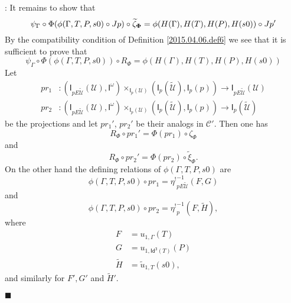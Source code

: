 \documentclass[12pt]{article}
\numberwithin{equation}{section}
\newenvironment{myproof}{{\bf Proof}:}{$\blacksquare$ \vskip 5mm }
\newcommand{\sr}{\rightarrow}
\newcommand{\wt}{\widetilde}
\newcommand{\Idx}{\mathsf{Id^3}} %
\newcommand{\U}{\mathcal{U}}
\newcommand{\I}{\mathsf{I}}
\newcommand{\etashriek}{\eta^!}
\newcommand{\etaunshriek}{{\etashriek}^{-1}}
\begin{document}
\begin{myproof}
It remains to show that
%
$$\psi_{\Gamma}\circ \Phi(\phi(\Gamma,T,P,s0)\circ Jp)\circ
\wt{\zeta}_{\bf\Phi}=\phi(H(\Gamma),H(T),H(P),H(s0))\circ Jp'$$
%
By the compatibility condition of Definition \ref{2015.04.06.def6} we see that
it is sufficient to prove that
%
$$\psi_{\Gamma}\circ \Phi(\phi(\Gamma,T,P,s0))\circ R_{\Phi} =
\phi(H(\Gamma),H(T),H(P),H(s0))$$
%
Let
%
\begin{align*}
  pr_1 & :(\I_{pE\wt{\U}}(\U),\I^{\omega})\times_{\I_{p}(\U)}(\I_{p}(\wt{\U}),\I_p(p))\sr \I_{pE\wt{\U}}(\U) \\
  pr_2 & :(\I_{pE\wt{\U}}(\U),\I^{\omega})\times_{\I_{p}(\U)}(\I_{p}(\wt{\U}),\I_p(p))\sr \I_{p}(\wt{\U})
\end{align*}
%
be the projections and let $pr_1'$, $pr_2'$ be their analogs in $\mathcal
C'$. Then one has
%
$$R_{\Phi}\circ pr_1'=\Phi(pr_1)\circ \zeta_{\Phi}$$
and
$$R_{\Phi}\circ pr_2'=\Phi(pr_2)\circ \wt{\xi}_{\Phi}.$$
%
On the other hand the defining relations of $\phi(\Gamma,T,P,s0)$ are
%
$$\phi(\Gamma,T,P,s0)\circ pr_1=\etaunshriek_{pE\wt{\U}}(F,G)$$
and
$$\phi(\Gamma,T,P,s0)\circ pr_2=\etaunshriek_p(F,\wt{H}),$$
%
where
%
\begin{align*}
  F&=u_{1,\Gamma}(T) \\
  G&=u_{1,\Idx(T)}(P)\\
  \wt{H}&=\wt{u}_{1,T}(s0),
\end{align*}
%
and similarly for $F',G'$ and $\wt{H}'$.


\end{myproof}
\end{document}
